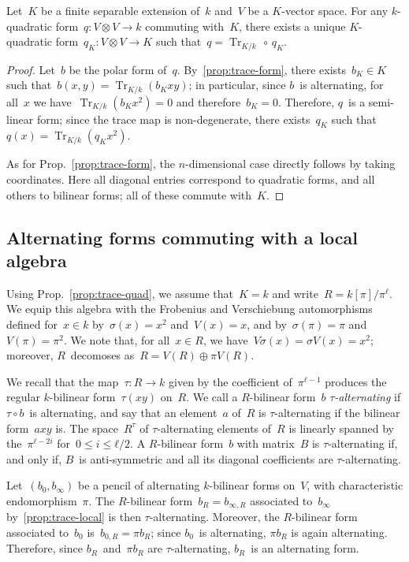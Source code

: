 \documentclass{article}%
\DeclareMathOperator\Tr{Tr}
\begin{document}
\begin{prop} \label{prop:trace-quad}%
Let~$K$ be a finite separable extension of~$k$ and~$V$ be a $K$-vector
space. For any $k$-quadratic form~$q: V ⊗ V → k$ commuting with~$K$,
there exists a unique $K$-quadratic form~$q_K: V ⊗ V → K$ such that~$q =
\Tr_{K/k} \, ∘ \, q_K$.
\end{prop}

\begin{proof}
Let~$b$ be the polar form of~$q$. By~\ref{prop:trace-form},
there exists~$b_K ∈ K$
such that~$b(x,y) = \Tr_{K/k} (b_K xy)$; in particular, since $b$~is
alternating, for all~$x$ we have~$\Tr_{K/k} (b_K x^2) = 0$ and
therefore~$b_K = 0$. Therefore, $q$~is a semi-linear form; since the
trace map is non-degenerate, there exists~$q_K$ such that~$q(x) =
\Tr_{K/k} (q_K x^2)$.

As for Prop.~\ref{prop:trace-form}, the $n$-dimensional case directly follows by
taking coordinates. Here all diagonal entries correspond to quadratic
forms, and all others to bilinear forms; all of these commute with~$K$.
\end{proof}%

\subsection{Alternating forms commuting with a local algebra}%
\label{SS:alt-pencil}

Using Prop.~\ref{prop:trace-quad},
we assume that~$K = k$ and write~$R = k[π] / π^ℓ$.
We equip this algebra with the Frobenius and Verschiebung automorphisms
defined for~$x ∈ k$ by~$σ(x) = x^2$ and~$V(x) = x$,
and by~$σ(π) = π$ and~$V(π) = π^2$.
We note that, for all~$x ∈ R$, we have~$V σ(x) = σ V(x) = x^2$;
moreover, $R$~decomoses as~$R = V(R) ⊕ π V(R)$.

We recall that the map~$τ: R → k$ given by the coefficient of~$π^{ℓ-1}$
produces the regular $k$-bilinear form~$τ(x y)$ on~$R$.
We call a $R$-bilinear form~$b$ \emph{$τ$-alternating} if $τ ∘ b$~is
alternating, and say that an element~$a$ of~$R$ is $τ$-alternating if the
bilinear form~$a x y$ is.
The space~$R^{τ}$ of $τ$-alternating elements of~$R$ is linearly spanned
by the~$π^{ℓ-2i}$ for~$0 ≤ i ≤ ℓ/2$.
A $R$-bilinear form~$b$ with matrix~$B$ is $τ$-alternating if, and only if,
$B$~is anti-symmetric and all its diagonal coefficients are $τ$-alternating.

Let~$(b_0, b_{∞})$ be a pencil of alternating $k$-bilinear forms on~$V$,
with characteristic endomorphism~$π$. The $R$-bilinear form~$b_R = b_{∞,
R}$ associated to~$b_{∞}$ by~\ref{prop:trace-local} is then
$τ$-alternating. Moreover, the $R$-bilinear form associated to~$b_{0}$
is~$b_{0, R} = π b_R$; since $b_{0}$~is alternating, $π b_R$ is again
alternating. Therefore, since $b_R$~and~$π b_R$ are $τ$-alternating,
$b_R$~is an alternating form.
\end{document}
